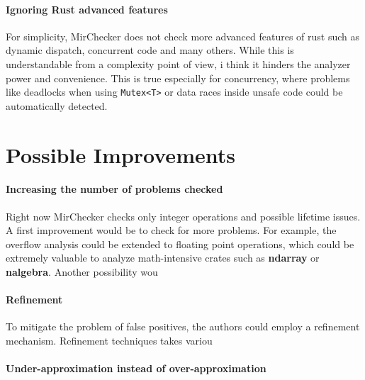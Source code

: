 \documentclass{article}
\begin{document}
\paragraph*{Ignoring Rust advanced features}
For simplicity, MirChecker does not check more advanced features of rust such as dynamic dispatch, concurrent code and many others. While 
this is understandable from a complexity point of view, i think it hinders the analyzer power and convenience. This is true especially for concurrency, 
where problems like deadlocks when using \texttt{Mutex<T>} or data races inside unsafe code could be automatically detected.

\section*{Possible Improvements}

\paragraph*{Increasing the number of problems checked}
Right now MirChecker checks only integer operations and possible lifetime issues. 
A first improvement would be to check for more problems. For example, the overflow 
analysis could be extended to floating point operations, which could be extremely valuable 
to analyze math-intensive crates such as \textbf{ndarray} or \textbf{nalgebra}. Another possibility wou

\paragraph*{Refinement}
To mitigate the problem of false positives, the authors could employ a refinement mechanism. Refinement techniques 
takes variou
\paragraph*{Under-approximation instead of over-approximation}



\end{document}
